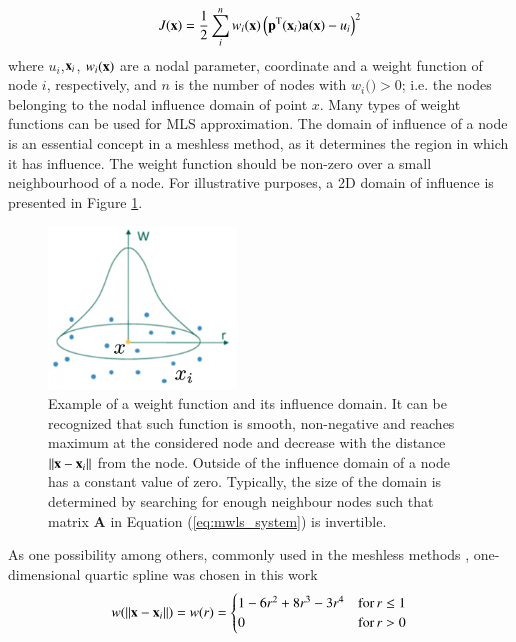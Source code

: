 \documentclass[11pt]{acmeArticle}
\numberwithin{equation}{section}
\begin{document}
\begin{equation}
J({{\boldsymbol {\rm x}}})=\frac{1}{2} \sum_i^n w_i({{\boldsymbol {\rm x}}}) \left( \mathbf p^{\rm T} ({\boldsymbol {\rm x}}_i)\mathbf a({\boldsymbol {\rm x}}) - u_i \right)^2
\label{eq:mwls_l2}
\end{equation}
where $u_i$,${\boldsymbol {\rm x}}_i $, $w_i({{\boldsymbol {\rm x}}})$ are a nodal parameter, coordinate and a weight function of node $i$, respectively, and $n$ is the number of nodes with $w_i(\mathrm) > 0$; i.e. the nodes belonging to the nodal influence domain of point $x$. Many types of weight functions can be used for MLS approximation. The domain of influence of a node is an essential concept in a meshless method, as it determines the region in which it has influence. The weight function should be non-zero over a small neighbourhood of a node. For illustrative purposes, a 2D domain of influence is presented in Figure \ref{fig:weight_func}.
\begin{figure}[h!]
	\begin{centering}
		\includegraphics[width=5cm]{Figures/weight_func.png}
		\caption{Example of a weight function and its influence domain. It can be recognized that such function is smooth, non-negative and reaches maximum at the considered node and decrease with the distance $|| {\boldsymbol {\rm x}} - {\boldsymbol {\rm x}}_i||$ from the node. Outside of the influence domain of a node has a constant value of zero. Typically, the size of the domain is determined by searching for enough neighbour nodes such that matrix $\mathbf A$ in Equation (\ref{eq:mwls_system}) is invertible.}
		\label{fig:weight_func}
	\end{centering}
\end{figure}
As one possibility among others, commonly used in the meshless methods  \citep{belytschko1996meshless}, one-dimensional quartic spline was chosen in this work
\begin{equation}
w(||{\boldsymbol {\rm x}}-{\boldsymbol {\rm x}}_i||)=w(r)=\begin{cases} 1-6r^2+8r^3-3r^4 & \mathrm{for} \, r \leq 1\\ 0 & \mathrm{for} \, r > 0 \end{cases}
\end{equation}
\end{document}
